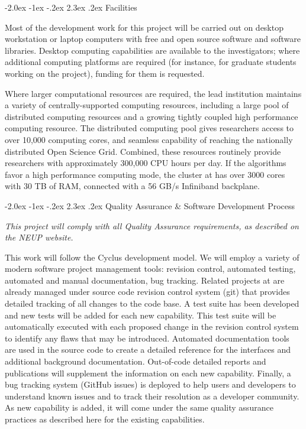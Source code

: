 \documentclass[dvips,11pt]{article}
\makeatletter
\renewcommand\section{\@startsection {section}{1}{\z@}%
                                   {-2.0ex \@plus -1ex \@minus -.2ex}%
                                   {2.3ex \@plus.2ex}%
                                   {\normalfont\bfseries}}%
\makeatother
\begin{document}
\section{Facilities}

Most of the development work for this project will be carried out on desktop
workstation or laptop computers with free and open source software and software
libraries. Desktop computing capabilities are available to the investigators;
where additional computing platforms are required (for instance, for graduate
students working on the project), funding for them is requested.

Where larger computational resources are required, the lead institution
maintains a variety of centrally-supported computing resources, including a
large pool of distributed computing resources and a growing tightly coupled high
performance computing resource. The distributed computing pool gives researchers
access to over 10,000 computing cores, and seamless capability of reaching the
nationally distributed Open Science Grid. Combined, these resources routinely
provide researchers with approximately 300,000 CPU hours per day. If the
algorithms favor a high performance computing mode, the cluster at has over 3000
cores with 30 TB of RAM, connected with a 56 GB/s Infiniband backplane.

\section{Quality Assurance \& Software Development Process}

\textit{This project will comply with all Quality Assurance requirements, as
described on the NEUP website.}  

This work will follow the Cyclus development model.  We will employ a variety of
modern software project management tools: revision control, automated testing,
automated and manual documentation, bug tracking. Related projects at are
already managed under source code revision control system (git) that provides
detailed tracking of all changes to the code base. A test suite has been
developed and new tests will be added for each new capability. This test suite
will be automatically executed with each proposed change in the revision control
system to identify any flaws that may be introduced. Automated documentation
tools are used in the source code to create a detailed reference for the
interfaces and additional background documentation. Out-of-code detailed reports
and publications will supplement the information on each new capability.
Finally, a bug tracking system (GitHub issues) is deployed to help users and
developers to understand known issues and to track their resolution as a
developer community. As new capability is added, it will come under the same
quality assurance practices as described here for the existing capabilities.
\end{document}
